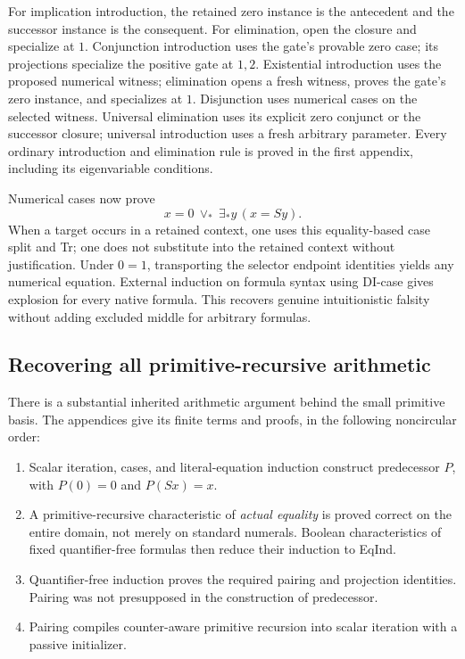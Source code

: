 \documentclass[11pt,letterpaper]{article}
\theoremstyle{definition}\newtheorem{definition}[theorem]{Definition}
\theoremstyle{remark}\newtheorem{remark}[theorem]{Remark}
\begin{document}
For implication introduction, the retained zero instance is the
antecedent and the successor instance is the consequent. For elimination,
open the closure and specialize at $1$. Conjunction introduction uses
the gate's provable zero case; its projections specialize the positive
gate at $1,2$. Existential introduction uses the proposed numerical
witness; elimination opens a fresh witness, proves the gate's zero
instance, and specializes at $1$. Disjunction uses numerical cases on
the selected witness. Universal elimination uses its explicit zero
conjunct or the successor closure; universal introduction uses a fresh
arbitrary parameter. Every ordinary introduction and elimination rule
is proved in the first appendix, including its eigenvariable conditions.

Numerical cases now prove
\[
 x=0\ \vee_*\ \exists_*y\,(x=Sy).
\]
When a target occurs in a retained context, one uses this equality-based
case split and Tr; one does not substitute into the retained context
without justification. Under $0=1$, transporting the selector endpoint
identities yields any numerical equation. External induction on formula
syntax using DI-case gives explosion for every native formula. This
recovers genuine intuitionistic falsity without adding excluded middle
for arbitrary formulas.

\subsection{Recovering all primitive-recursive arithmetic}

There is a substantial inherited arithmetic argument behind the small
primitive basis. The appendices give its finite terms and proofs, in
the following noncircular order:
\begin{enumerate}
\item Scalar iteration, cases, and literal-equation induction construct
      predecessor $P$, with $P(0)=0$ and $P(Sx)=x$.
\item A primitive-recursive characteristic of \emph{actual equality}
      is proved correct on the entire domain, not merely on standard
      numerals. Boolean characteristics of fixed quantifier-free
      formulas then reduce their induction to EqInd.
\item Quantifier-free induction proves the required pairing and
      projection identities. Pairing was not presupposed in the
      construction of predecessor.
\item Pairing compiles counter-aware primitive recursion into
      scalar iteration with a passive initializer.
\end{enumerate}
\end{document}
